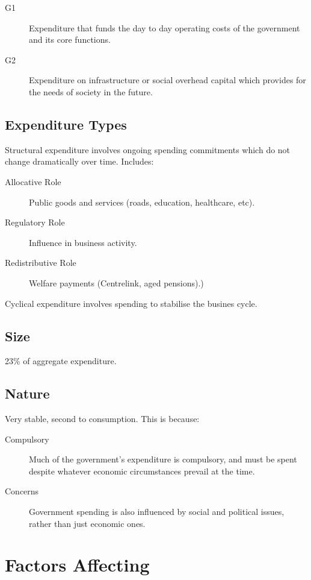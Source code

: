 \documentclass[a4paper,11pt]{article}
\begin{document}
\begin{description}
\item [G1] Expenditure that funds the day to day operating costs of the
	government and its core functions.
\item [G2] Expenditure on infrastructure or social overhead capital which
	provides for the needs of society in the future.
\end{description}


\subsection{Expenditure Types}

Structural expenditure involves ongoing spending commitments which do not
change dramatically over time. Includes:

\begin{description}
\item [Allocative Role] Public goods and services (roads, education, healthcare,
	etc).
\item [Regulatory Role] Influence in business activity.
\item [Redistributive Role] Welfare payments (Centrelink, aged pensions).)
\end{description}

Cyclical expenditure involves spending to stabilise the busines cycle.


\subsection{Size}

23\% of aggregate expenditure.


\subsection{Nature}

Very stable, second to consumption. This is because:

\begin{description}
\item [Compulsory] Much of the government's expenditure is compulsory, and must
	be spent despite whatever economic circumstances prevail at the time.
\item [Concerns] Government spending is also influenced by social and political
	issues, rather than just economic ones.
\end{description}


\section{Factors Affecting}
\end{document}
